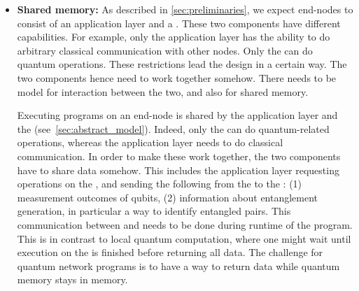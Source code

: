 \begin{itemize}
      \item \label{item:design_return} \textbf{Shared memory:}
            As described in \cref{sec:preliminaries}, we expect end-nodes to consist of an application layer and a \QNPU.
            These two components have different capabilities.
            For example, only the application layer has the ability to do arbitrary classical communication with other nodes.
            Only the \QNPU can do quantum operations.
            These restrictions lead the design in a certain way.
            The two components hence need to work together somehow.
            There needs to be model for interaction between the two, and also for shared memory.

            Executing programs on an end-node is shared by the application layer and the \QNPU (see~\cref{sec:abstract_model}).
            Indeed, only the \QNPU can do quantum-related operations, whereas the application layer needs to do classical communication.
            In order to make these work together, the two components have to share data somehow.
            This includes the application layer requesting operations on the \QNPU, and sending the following from the \QNPU to the \host:
                (1) measurement outcomes of qubits,
                (2) information about entanglement generation, in particular a way to identify entangled pairs.
            This communication between \host and \QNPU needs to be done during runtime of the program.
            This is in contrast to local quantum computation, where one might wait until execution on the \QNPU is finished before returning all data.
            The challenge for quantum network programs is to have a way to return data while quantum memory stays in memory.


\end{itemize}
